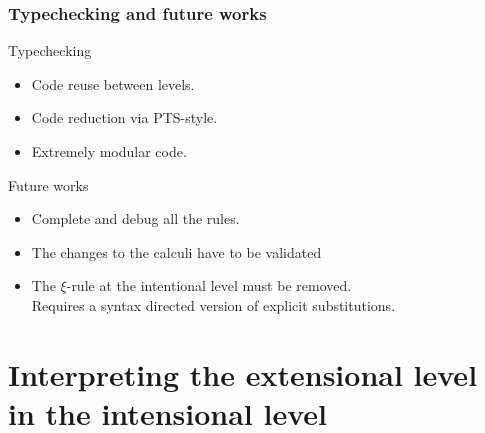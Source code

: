 \documentclass{beamer}
\begin{document}
\begin{frame}{}\frametitle{Typechecking and future works}

\begin{block}{Typechecking}
\begin{itemize}
	\item Code reuse between levels.
	\item Code reduction via PTS-style.
	\item Extremely modular code.
\end{itemize}
\end{block}
\begin{block}{Future works}
\begin{itemize}
        \item Complete and debug all the rules.
	\item The changes to the calculi have to be validated
	\item The $\xi$-rule at the intentional level must be removed.\\
          Requires a syntax directed version of explicit substitutions.
\end{itemize}
\end{block}
\end{frame}

\section[Interpretation]{Interpreting the extensional level in the intensional level}
\end{document}
